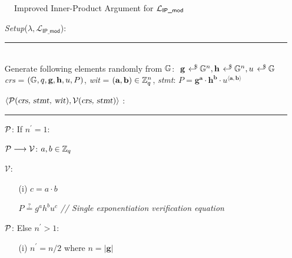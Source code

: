 \begin{figure}[h!]
    \caption{Improved Inner-Product Argument for $\L_{\textsf{IP\_mod}}$}
    \label{algo2}
\end{figure}
\begin{mdframed}[skipabove=\topsep]
    \begin{itemize}[itemsep=4pt]
        \item[] \textsl{Setup}($\lambda, \mathcal{L}_{\textsf{IP\_mod}}$):
        \\[-5pt]\rule{\textwidth}{0.4pt}\\ 
        Generate following elements randomly from $\G$: $\ \textbf{g} \rgen \G^{n}, \textbf{h} \rgen \G^n, u \rgen \G$
        \\[2pt]
        \textsl{crs} = $(\G, q, \textbf{g}, \textbf{h}, u, P)$, \textsl{wit} = $(\textbf{a}, \textbf{b}) \in \Z_q^n$, \textsl{stmt}: $P = \textbf{g}^\textbf{a} \cdot \textbf{h}^\textbf{b} \cdot u^{\langle \textbf{a},\textbf{b} \rangle}$
        \vspace{2pt}
    
        \item[] $\langle \mathcal{P}(\textsl{crs, stmt, wit}), \mathcal{V}(\textsl{crs, stmt}) \rangle$ :
        \\[-5pt]\rule{\textwidth}{0.4pt}

        \vspace{-4pt}
        \item[] $\P$: If $n^{\prime} = 1$: \vspace{-4pt}
        
        \item[] $\mathcal{P} \longrightarrow \V$: $a,b \in \Z_q$
        
        \vspace{-4pt}
        \item[] $\mathcal{V}$: \vspace{-4pt}
        \begin{enumerate}[itemsep=5pt]
            \item[(i)] $c = a \cdot b$
    
            $P \stackrel{?}{=} g^a h^b u^c$ \hfill{\footnotesize \textit{// Single exponentiation verification equation}}
        \end{enumerate}
    
        \vspace{-4pt}
        \item[] $\P$: Else $n^{\prime} > 1$: \vspace{-4pt}
        \begin{enumerate}[itemsep=5pt]
            \item[(i)] $n^{\prime} = n/2$ where $n = |\textbf{g}|$ 
            

\end{enumerate}
\end{itemize}
\end{mdframed}
